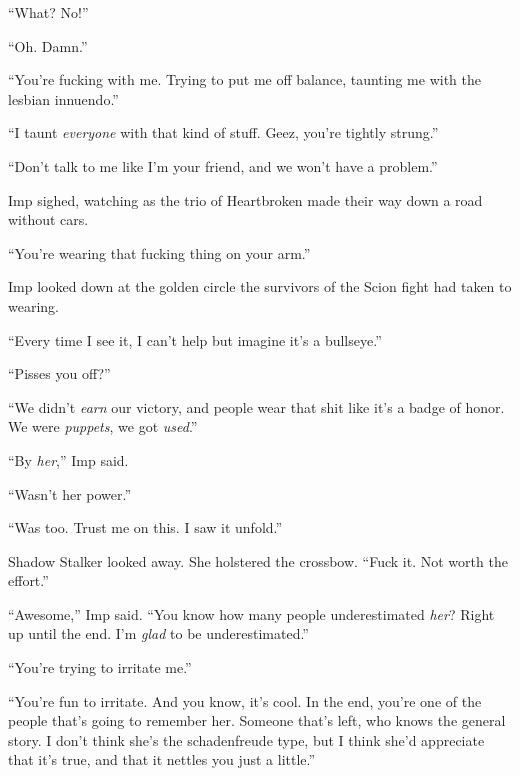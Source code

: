 ``What?  No!''



``Oh.  Damn.''



``You're fucking with me.  Trying to put me off balance, taunting me with the lesbian innuendo.''



``I taunt \emph{everyone} with that kind of stuff.  Geez, you're tightly strung.''



``Don't talk to me like I'm your friend, and we won't have a problem.''



Imp sighed, watching as the trio of Heartbroken made their way down a road without cars.



``You're wearing that fucking thing on your arm.''



Imp looked down at the golden circle the survivors of the Scion fight had taken to wearing.



``Every time I see it, I can't help but imagine it's a bullseye.''



``Pisses you off?''



``We didn't \emph{earn} our victory, and people wear that shit like it's a badge of honor.  We were \emph{puppets}, we got \emph{used}.''



``By \emph{her},'' Imp said.



``Wasn't her power.''



``Was too.  Trust me on this.  I saw it unfold.''



Shadow Stalker looked away.  She holstered the crossbow.  ``Fuck it.  Not worth the effort.''



``Awesome,'' Imp said.  ``You know how many people underestimated \emph{her}?  Right up until the end.  I'm \emph{glad} to be underestimated.''



``You're trying to irritate me.''



``You're fun to irritate.  And you know, it's cool.  In the end, you're one of the people that's going to remember her.  Someone that's left, who knows the general story.  I don't think she's the schadenfreude type, but I think she'd appreciate that it's true, and that it nettles you just a little.''



